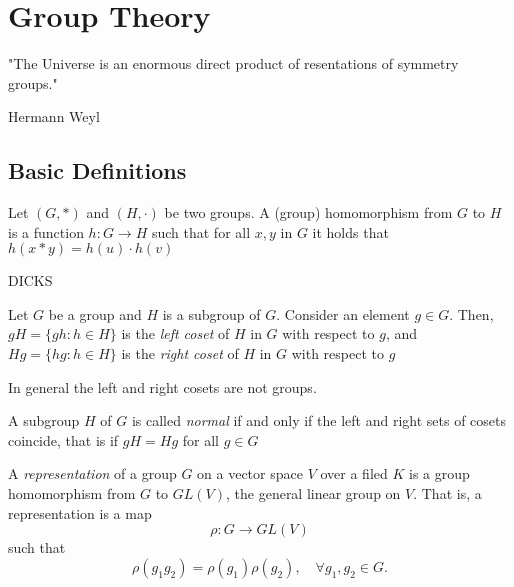 \chapter{Group Theory}
\adjustmtc
\minitoc
\epigraph{"The Universe is an enormous direct product of resentations of
symmetry groups."}{Hermann Weyl}
\section{Basic Definitions}
\begin{definition}
Let $(G, *)$ and $(H,\cdot)$ be two groups. A (group) homomorphism from $G$ to $H$ is a function $h:G\rightarrow H$ such that for all $x,y$ in $G$ it holds that
$h(x*y) = h(u)\cdot h(v)$
\end{definition}
DICKS
\begin{definition}[Coset]
Let $G$ be a group and $H$ is a subgroup of $G$. Consider an element $g \in G$. Then, $gH = \{ gh : h\in H\}$ is the \textit{left coset} of $H$ in $G$ with respect to $g$, and $Hg = \{hg : h\in H\}$ is the \textit{right coset} of $H$ in $G$ with respect to $g$
\end{definition}

\begin{remark}
In general the left and right cosets are not groups.
\end{remark}

\begin{definition}
A subgroup $H$ of $G$ is called \textit{normal} if and only if the left and right sets of cosets coincide, that is if $gH = Hg$ for all $g\in G$ 
\end{definition}

\begin{definition}[Representation]
  A \textit{representation} of a group $G$ on a vector space $V$ over a filed
  $K$ is a group homomorphism from $G$ to $GL(V)$, the general linear group on
  $V$. That is, a representation is a map
  \begin{equation}
    \rho:G\rightarrow GL(V)
  \end{equation}
such that
\begin{equation}
  \rho(g_1g_2) = \rho(g_1)\rho(g_2), \quad \forall g_1,g_2 \in G.
\end{equation}
\end{definition}

